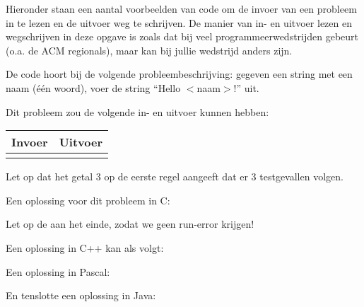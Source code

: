 Hieronder staan een aantal voorbeelden van code om de invoer van een
probleem in te lezen en de uitvoer weg te schrijven. De manier van
in- en uitvoer lezen en wegschrijven in deze opgave is zoals dat bij
veel programmeerwedstrijden gebeurt (o.a. de ACM regionals), maar kan
bij jullie wedstrijd anders zijn.

De code hoort bij de volgende probleembeschrijving: gegeven een string
met een naam (\'e\'en woord), voer de string ``Hello $<$naam$>$!'' uit.

Dit probleem zou de volgende in- en uitvoer kunnen hebben:

\begin{tabular}{|p{}|p{}|}
\hline
\textbf{Invoer} & \textbf{Uitvoer} \\
\hline
 &
 \\
\hline
\end{tabular}

Let op dat het getal 3 op de eerste regel aangeeft dat er 3
testgevallen volgen.

Een oplossing voor dit probleem in C:

Let op de  aan het einde, zodat we geen
run-error krijgen!

\newpage

Een oplossing in C++ kan als volgt:

Een oplossing in Pascal:

\newpage

En tenslotte een oplossing in Java:


